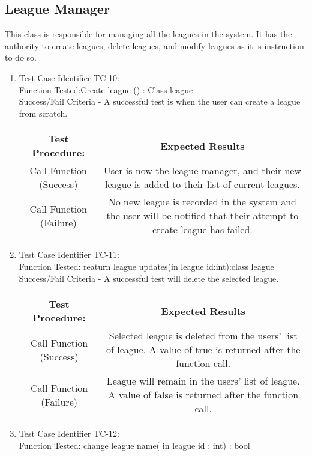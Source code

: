 \subsection{League Manager}
This class is responsible for managing all the leagues in the system. It has the
authority to create leagues, delete leagues, and modify leagues as it is
instruction to do so.\\
\begin{enumerate}
  \item
  Test Case Identifier TC-10:\\
    Function Tested:Create league () : Class league\\
    Success/Fail Criteria - A successful test is when the user can create a
    league from scratch.\\
    \begin{tabular}{| c | c |}
    \hline
    \textbf{Test Procedure:} & \textbf{Expected Results} \\ \hline
    Call Function (Success) & User is now the league manager, and their new
    league is added to their list of current leagues. \\ \hline
    Call Function (Failure) & No new league is recorded in the system and the
    user will be notified that their attempt to create league has failed.
    \\ \hline
    \end{tabular}
  \item
  Test Case Identifier TC-11:\\
    Function Tested: reaturn league updates(in league id:int):class league \\
    Success/Fail Criteria - A successful test will delete the selected league.\\
    \begin{tabular}{| c | c |}
    \hline
    \textbf{Test Procedure:} & \textbf{Expected Results} \\ \hline
    Call Function (Success) & Selected league is deleted from the users’ list of
    league. A value of true is returned after the function call. \\ \hline
    Call Function (Failure) & League will remain in the users’ list of league. A
    value of false is returned after the function call. \\ \hline
    \end{tabular}
  \item
  Test Case Identifier TC-12:\\
    Function Tested: change league name( in league id : int) : bool \\

\end{enumerate}
